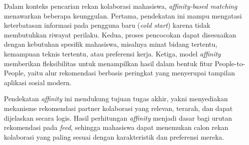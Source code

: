Dalam konteks pencarian rekan kolaborasi mahasiswa, \textit{affinity-based matching} menawarkan beberapa keunggulan. Pertama, pendekatan ini mampu mengatasi keterbatasan informasi pada pengguna baru (\textit{cold start}) karena tidak membutuhkan riwayat perilaku. Kedua, proses pencocokan dapat disesuaikan dengan kebutuhan spesifik mahasiswa, misalnya minat bidang tertentu, kemampuan teknis tertentu, atau preferensi kerja. Ketiga, model \textit{affinity} memberikan fleksibilitas untuk menampilkan hasil dalam bentuk fitur  People-to-People, yaitu alur rekomendasi berbasis peringkat yang menyerupai tampilan aplikasi sosial modern.

Pendekatan \textit{affinity} ini mendukung tujuan tugas akhir, yakni menyediakan mekanisme rekomendasi partner kolaborasi yang relevan, terarah, dan dapat dijelaskan secara logis. Hasil perhitungan \textit{affinity} menjadi dasar bagi urutan rekomendasi pada \textit{feed}, sehingga mahasiswa dapat menemukan calon rekan kolaborasi yang paling sesuai dengan karakteristik dan preferensi mereka.

